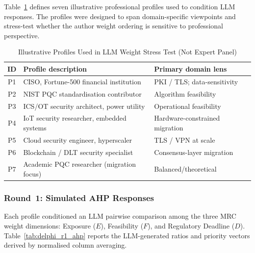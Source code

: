 Table~\ref{tab:delphi_personas} defines seven illustrative professional
profiles used to condition LLM responses. The profiles were designed
to span domain-specific viewpoints and stress-test whether the author
weight ordering is sensitive to professional perspective.

\begin{table}[!t]
\caption{Illustrative Profiles Used in LLM Weight Stress Test (Not Expert Panel)}
\label{tab:delphi_personas}
\centering
\renewcommand{\arraystretch}{1.15}
\footnotesize
\begin{tabular}{@{}clp{4.5cm}@{}}
\toprule
\textbf{ID} & \textbf{Profile description} & \textbf{Primary domain lens} \\
\midrule
P1 & CISO, Fortune-500 financial institution & PKI / TLS; data-sensitivity \\
P2 & NIST PQC standardisation contributor   & Algorithm feasibility \\
P3 & ICS/OT security architect, power utility & Operational feasibility \\
P4 & IoT security researcher, embedded systems & Hardware-constrained migration \\
P5 & Cloud security engineer, hyperscaler   & TLS / VPN at scale \\
P6 & Blockchain / DLT security specialist   & Consensus-layer migration \\
P7 & Academic PQC researcher (migration focus) & Balanced/theoretical \\
\bottomrule
\end{tabular}
\end{table}

\subsubsection*{Round~1: Simulated AHP Responses}

Each profile conditioned an LLM pairwise comparison among the three MRC
weight dimensions: Exposure ($E$), Feasibility ($F$), and Regulatory
Deadline ($D$). Table~\ref{tab:delphi_r1_ahp} reports the LLM-generated
ratios and priority vectors derived by normalised column averaging.

